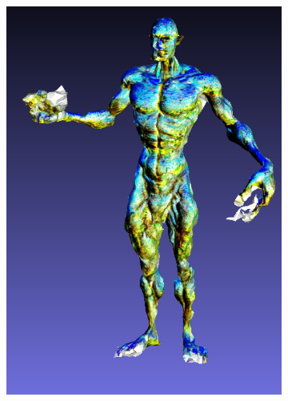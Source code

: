 \begin{figure}[ht]
\begin{subfigure}[b]{0.108\textwidth}
        \caption{}
    \end{subfigure}
    \begin{subfigure}[b]{0.2\textwidth}
        \centering
        \includegraphics[width=\textwidth]{figures/appendix/bias_rich_fantasia3d.png}
        \caption{}
    \end{subfigure}
    \begin{subfigure}[b]{0.12\textwidth}
        \centering

\end{subfigure}
\end{figure}
